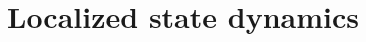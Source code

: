 \documentclass[prl,aps,twocolumn,showpacs,superscriptaddress,longbibliography]{revtex4-1}
\begin{document}
















%
\section{Localized state dynamics}
\end{document}
